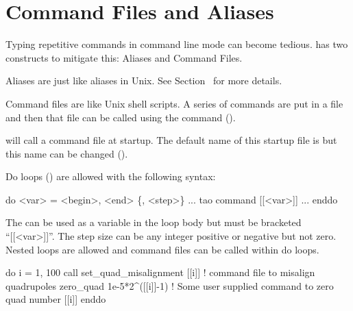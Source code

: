 \section{Command Files and Aliases}
\label{s:command.files} 

Typing repetitive commands in command line mode can become tedious. \tao has two constructs to
mitigate this: Aliases and Command Files. 

Aliases are just like aliases in Unix. See Section~ for more details.

Command files are like Unix shell scripts. A series of commands are
put in a file and then that file can be called using the 
command ().

\tao will call a command file at startup. The default name of this startup file is 
but this name can be changed ().

Do loops () are allowed with the following syntax:
\begin{example}
  do <var> = <begin>, <end> \{, <step>\} 
    ...
    tao command [[<var>]]
    ...
  enddo
\end{example}
The  can be used as a variable in the loop body but must be
bracketed ``[[<var>]]''.  The step size can be any integer positive or
negative but not zero.  Nested loops are allowed and command files can
be called within do loops.

\begin{example}
  do i = 1, 100
    call set_quad_misalignment [[i]] ! command file to misalign quadrupoles
    zero_quad 1e-5*2^([[i]]-1) ! Some user supplied command to zero quad number [[i]]
  enddo
\end{example}

